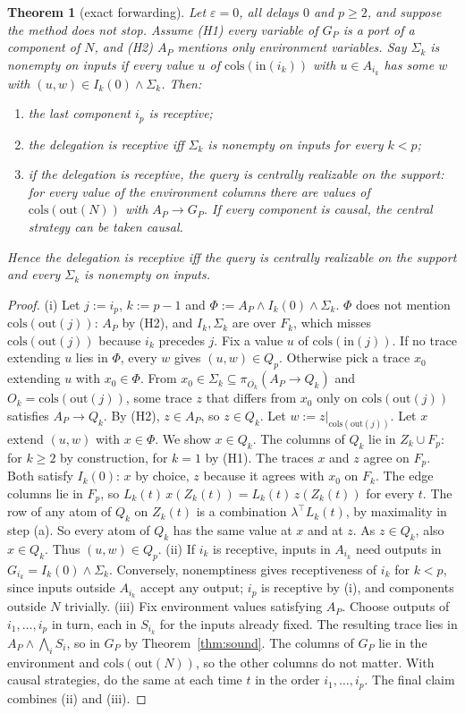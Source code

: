 \documentclass[11pt]{article}
\newtheorem{theorem}{Theorem}
\theoremstyle{definition}
\theoremstyle{remark}
\newcommand{\cols}{\mathrm{cols}}
\newcommand{\inp}{\mathrm{in}}
\newcommand{\out}{\mathrm{out}}
\newcommand{\eps}{\varepsilon}
\begin{document}
\begin{theorem}[exact forwarding]\label{thm:exact}
Let $\eps=0$, all delays $0$ and $p\ge2$, and suppose the method does not stop.
Assume (H1) every variable of $G_P$ is a port of a component of $N$, and (H2) $A_P$ mentions only environment variables.
Say $\Sigma_k$ is \emph{nonempty on inputs} if every value $u$ of $\cols(\inp(i_k))$ with $u\in A_{i_k}$ has some $w$ with $(u,w)\in I_k(0)\wedge\Sigma_k$. Then:
\begin{enumerate}[label=(\roman*)]
\item the last component $i_p$ is receptive;
\item the delegation is receptive iff $\Sigma_k$ is nonempty on inputs for every $k<p$;
\item if the delegation is receptive, the query is centrally realizable on the support: for every value of the environment columns there are values of $\cols(\out(N))$ with $A_P\to G_P$.
If every component is causal, the central strategy can be taken causal.
\end{enumerate}
Hence the delegation is receptive iff the query is centrally realizable on the support and every $\Sigma_k$ is nonempty on inputs.
\end{theorem}
\begin{proof}
(i) Let $j:=i_p$, $k:=p-1$ and $\Phi:=A_P\wedge I_k(0)\wedge\Sigma_k$.
$\Phi$ does not mention $\cols(\out(j))$: $A_P$ by (H2), and $I_k,\Sigma_k$ are over $F_k$, which misses $\cols(\out(j))$ because $i_k$ precedes $j$.
Fix a value $u$ of $\cols(\inp(j))$.
If no trace extending $u$ lies in $\Phi$, every $w$ gives $(u,w)\in Q_p$.
Otherwise pick a trace $x_0$ extending $u$ with $x_0\in\Phi$.
From $x_0\in\Sigma_k\subseteq\pi_{\overline{O_k}}(A_P\to Q_k)$ and $O_k=\cols(\out(j))$, some trace $z$ that differs from $x_0$ only on $\cols(\out(j))$ satisfies $A_P\to Q_k$.
By (H2), $z\in A_P$, so $z\in Q_k$. Let $w:=z|_{\cols(\out(j))}$.
Let $x$ extend $(u,w)$ with $x\in\Phi$. We show $x\in Q_k$.
The columns of $Q_k$ lie in $Z_k\cup F_p$: for $k\ge2$ by construction, for $k=1$ by (H1).
The traces $x$ and $z$ agree on $F_p$. Both satisfy $I_k(0)$: $x$ by choice, $z$ because it agrees with $x_0$ on $F_k$.
The edge columns lie in $F_p$, so $L_k(t)\,x(Z_k(t))=L_k(t)\,z(Z_k(t))$ for every $t$.
The row of any atom of $Q_k$ on $Z_k(t)$ is a combination $\lambda^\top L_k(t)$, by maximality in step (a).
So every atom of $Q_k$ has the same value at $x$ and at $z$. As $z\in Q_k$, also $x\in Q_k$.
Thus $(u,w)\in Q_p$.
(ii) If $i_k$ is receptive, inputs in $A_{i_k}$ need outputs in $G_{i_k}=I_k(0)\wedge\Sigma_k$. Conversely, nonemptiness gives receptiveness of $i_k$ for $k<p$, since inputs outside $A_{i_k}$ accept any output; $i_p$ is receptive by (i), and components outside $N$ trivially.
(iii) Fix environment values satisfying $A_P$. Choose outputs of $i_1,\dots,i_p$ in turn, each in $S_{i_k}$ for the inputs already fixed.
The resulting trace lies in $A_P\wedge\bigwedge_iS_i$, so in $G_P$ by Theorem~\ref{thm:sound}.
The columns of $G_P$ lie in the environment and $\cols(\out(N))$, so the other columns do not matter.
With causal strategies, do the same at each time $t$ in the order $i_1,\dots,i_p$.
The final claim combines (ii) and (iii).
\end{proof}
\end{document}
